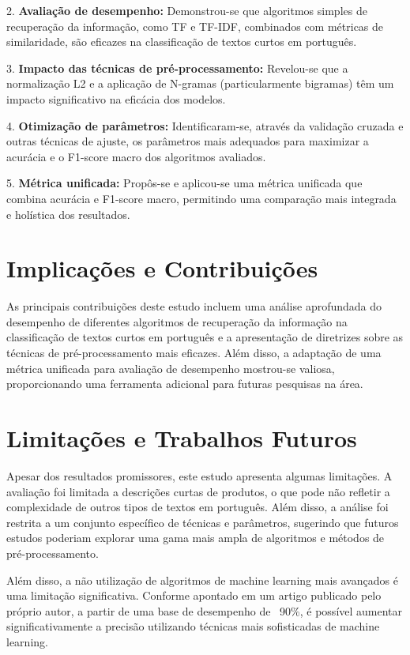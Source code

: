 2. \textbf{Avaliação de desempenho:} Demonstrou-se que algoritmos simples de recuperação da informação, como TF e TF-IDF, combinados com métricas de similaridade, são eficazes na classificação de textos curtos em português.

3. \textbf{Impacto das técnicas de pré-processamento:} Revelou-se que a normalização L2 e a aplicação de N-gramas (particularmente bigramas) têm um impacto significativo na eficácia dos modelos.

4. \textbf{Otimização de parâmetros:} Identificaram-se, através da validação cruzada e outras técnicas de ajuste, os parâmetros mais adequados para maximizar a acurácia e o F1-score macro dos algoritmos avaliados.

5. \textbf{Métrica unificada:} Propôs-se e aplicou-se uma métrica unificada que combina acurácia e F1-score macro, permitindo uma comparação mais integrada e holística dos resultados.

\section{Implicações e Contribuições}

As principais contribuições deste estudo incluem uma análise aprofundada do desempenho de diferentes algoritmos de recuperação da informação na classificação de textos curtos em português e a apresentação de diretrizes sobre as técnicas de pré-processamento mais eficazes. Além disso, a adaptação de uma métrica unificada para avaliação de desempenho mostrou-se valiosa, proporcionando uma ferramenta adicional para futuras pesquisas na área.

\section{Limitações e Trabalhos Futuros}

Apesar dos resultados promissores, este estudo apresenta algumas limitações. A avaliação foi limitada a descrições curtas de produtos, o que pode não refletir a complexidade de outros tipos de textos em português. Além disso, a análise foi restrita a um conjunto específico de técnicas e parâmetros, sugerindo que futuros estudos poderiam explorar uma gama mais ampla de algoritmos e métodos de pré-processamento.

Além disso, a não utilização de algoritmos de machine learning mais avançados é uma limitação significativa. Conforme apontado em um artigo publicado pelo próprio autor, a partir de uma base de desempenho de ~90\%, é possível aumentar significativamente a precisão utilizando técnicas mais sofisticadas de machine learning.

